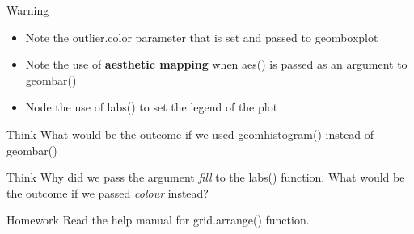 \documentclass[12pt]{book}\usepackage{knitr}
\begin{document}
\begin{DIY}{Warning}
\begin{itemize}
  \item \noindent Note the outlier$.$color parameter that is set and passed to geom\textunderscore boxplot
  \item \noindent Note the use of \textbf{aesthetic mapping} when aes() is passed as an argument to geom\textunderscore bar()
  \item \noindent Node the use of labs() to set the legend of the plot
\end{itemize}
\end{DIY}

\begin{DIY}{Think}
\noindent  What would be the outcome if we used geom\textunderscore histogram() instead of geom\textunderscore bar() 
\end{DIY}

\begin{DIY}{Think}
\noindent  Why did we pass the argument \emph{fill} to the labs() function. What would be the outcome if we passed \emph{colour} instead?
\end{DIY}

\begin{DIY}{Homework}
\noindent Read the help manual for grid$.$arrange() function.
\end{DIY}

\newpage
\end{document}
